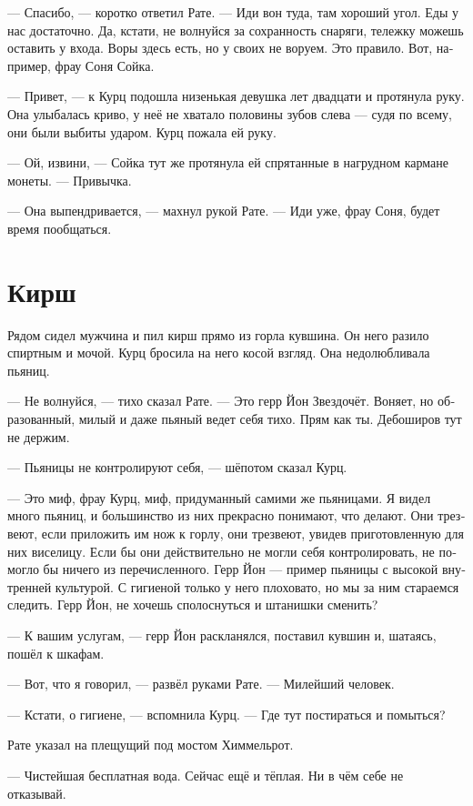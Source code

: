 \documentclass[a4paper,12pt,fleqn]{book}\usepackage{polyglossia}\setdefaultlanguage[babelshorthands=true]{russian}\setotherlanguage{english}\defaultfontfeatures{Ligatures=TeX,Mapping=tex-text}\usepackage{xcolor}\newcommand{\ml}[3]{#2}
\begin{document}
--- Спасибо, --- коротко ответил Рате.
--- Иди вон туда, там хороший угол.
Еды у нас достаточно.
Да, кстати, не волнуйся за сохранность снаряги, тележку можешь оставить у входа.
Воры здесь есть, но у своих не воруем.
Это правило.
Вот, например, фрау Соня Сойка.

--- Привет, --- к Курц подошла низенькая девушка лет двадцати и протянула руку.
Она улыбалась криво, у неё не хватало половины зубов слева --- судя по всему, они были выбиты ударом.
Курц пожала ей руку.

--- Ой, извини, --- Сойка тут же протянула ей спрятанные в нагрудном кармане монеты.
--- Привычка.

--- Она выпендривается, --- махнул рукой Рате.
--- Иди уже, фрау Соня, будет время пообщаться. 

\section{Кирш}

Рядом сидел мужчина и пил кирш прямо из горла кувшина.
Он него разило спиртным и мочой.
Курц бросила на него косой взгляд.
Она недолюбливала пьяниц.

--- Не волнуйся, --- тихо сказал Рате.
--- Это герр Йон Звездочёт.
Воняет, но образованный, милый и даже пьяный ведет себя тихо.
Прям как ты.
Дебоширов тут не держим.

--- Пьяницы не контролируют себя, --- шёпотом сказал Курц.

--- Это миф, фрау Курц, миф, придуманный самими же пьяницами.
Я видел много пьяниц, и большинство из них прекрасно понимают, что делают.
Они трезвеют, если приложить им нож к горлу, они трезвеют, увидев приготовленную для них виселицу.
Если бы они действительно не могли себя контролировать, не помогло бы ничего из перечисленного.
Герр Йон --- пример пьяницы с высокой внутренней культурой.
С гигиеной только у него плоховато, но мы за ним стараемся следить.
Герр Йон, не хочешь сполоснуться и штанишки сменить?

--- К вашим услугам, --- герр Йон раскланялся, поставил кувшин и, шатаясь, пошёл к шкафам.

--- Вот, что я говорил, --- развёл руками Рате.
--- Милейший человек.

--- Кстати, о гигиене, --- вспомнила Курц.
--- Где тут постираться и помыться?

Рате указал на плещущий под мостом Химмельрот.

--- Чистейшая бесплатная вода.
Сейчас ещё и тёплая.
\ml{$0$}
{Ни в чём себе не отказывай.}
{Help yourself.''}
\end{document}
